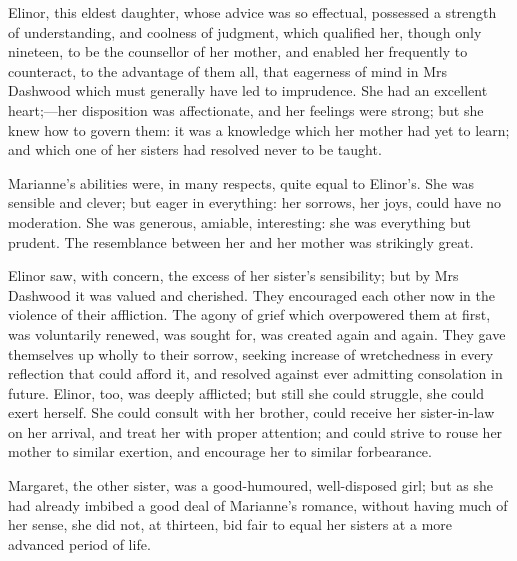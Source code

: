 Elinor, this eldest daughter, whose advice was so effectual, possessed a strength of understanding, and coolness of judgment, which qualified her, though only nineteen, to be the counsellor of her mother, and enabled her frequently to counteract, to the advantage of them all, that eagerness of mind in Mrs Dashwood which must generally have led to imprudence. She had an excellent heart;—her disposition was affectionate, and her feelings were strong; but she knew how to govern them: it was a knowledge which her mother had yet to learn; and which one of her sisters had resolved never to be taught.

Marianne’s abilities were, in many respects, quite equal to Elinor’s. She was sensible and clever; but eager in everything: her sorrows, her joys, could have no moderation. She was generous, amiable, interesting: she was everything but prudent. The resemblance between her and her mother was strikingly great.

Elinor saw, with concern, the excess of her sister’s sensibility; but by Mrs Dashwood it was valued and cherished. They encouraged each other now in the violence of their affliction. The agony of grief which overpowered them at first, was voluntarily renewed, was sought for, was created again and again. They gave themselves up wholly to their sorrow, seeking increase of wretchedness in every reflection that could afford it, and resolved against ever admitting consolation in future. Elinor, too, was deeply afflicted; but still she could struggle, she could exert herself. She could consult with her brother, could receive her sister-in-law on her arrival, and treat her with proper attention; and could strive to rouse her mother to similar exertion, and encourage her to similar forbearance.

Margaret, the other sister, was a good-humoured, well-disposed girl; but as she had already imbibed a good deal of Marianne’s romance, without having much of her sense, she did not, at thirteen, bid fair to equal her sisters at a more advanced period of life.